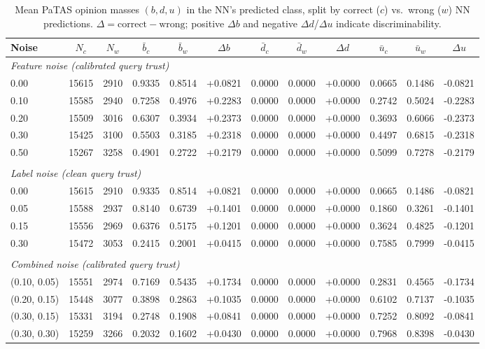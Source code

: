 \begin{table}[ht]
\centering
\caption{Mean PaTAS opinion masses $(b, d, u)$ in the NN's predicted class, split by correct ($c$) vs.\ wrong ($w$) NN predictions. $\Delta = \text{correct} - \text{wrong}$; positive $\Delta b$ and negative $\Delta d$/$\Delta u$ indicate discriminability.}
\label{tab:patas-effectiveness}
\begin{tabular}{lccccccccccc}
\toprule
Noise & $N_c$ & $N_w$ & $\bar{b}_c$ & $\bar{b}_w$ & $\Delta b$ & $\bar{d}_c$ & $\bar{d}_w$ & $\Delta d$ & $\bar{u}_c$ & $\bar{u}_w$ & $\Delta u$ \\
\midrule
\multicolumn{12}{l}{\textit{Feature noise (calibrated query trust)}} \\
0.00 & 15615 & 2910 & 0.9335 & 0.8514 & +0.0821 & 0.0000 & 0.0000 & +0.0000 & 0.0665 & 0.1486 & -0.0821 \\
0.10 & 15585 & 2940 & 0.7258 & 0.4976 & +0.2283 & 0.0000 & 0.0000 & +0.0000 & 0.2742 & 0.5024 & -0.2283 \\
0.20 & 15509 & 3016 & 0.6307 & 0.3934 & +0.2373 & 0.0000 & 0.0000 & +0.0000 & 0.3693 & 0.6066 & -0.2373 \\
0.30 & 15425 & 3100 & 0.5503 & 0.3185 & +0.2318 & 0.0000 & 0.0000 & +0.0000 & 0.4497 & 0.6815 & -0.2318 \\
0.50 & 15267 & 3258 & 0.4901 & 0.2722 & +0.2179 & 0.0000 & 0.0000 & +0.0000 & 0.5099 & 0.7278 & -0.2179 \\
\midrule \\
\multicolumn{12}{l}{\textit{Label noise (clean query trust)}} \\
0.00 & 15615 & 2910 & 0.9335 & 0.8514 & +0.0821 & 0.0000 & 0.0000 & +0.0000 & 0.0665 & 0.1486 & -0.0821 \\
0.05 & 15588 & 2937 & 0.8140 & 0.6739 & +0.1401 & 0.0000 & 0.0000 & +0.0000 & 0.1860 & 0.3261 & -0.1401 \\
0.15 & 15556 & 2969 & 0.6376 & 0.5175 & +0.1201 & 0.0000 & 0.0000 & +0.0000 & 0.3624 & 0.4825 & -0.1201 \\
0.30 & 15472 & 3053 & 0.2415 & 0.2001 & +0.0415 & 0.0000 & 0.0000 & +0.0000 & 0.7585 & 0.7999 & -0.0415 \\
\midrule \\
\multicolumn{12}{l}{\textit{Combined noise (calibrated query trust)}} \\
(0.10, 0.05) & 15551 & 2974 & 0.7169 & 0.5435 & +0.1734 & 0.0000 & 0.0000 & +0.0000 & 0.2831 & 0.4565 & -0.1734 \\
(0.20, 0.15) & 15448 & 3077 & 0.3898 & 0.2863 & +0.1035 & 0.0000 & 0.0000 & +0.0000 & 0.6102 & 0.7137 & -0.1035 \\
(0.30, 0.15) & 15331 & 3194 & 0.2748 & 0.1908 & +0.0841 & 0.0000 & 0.0000 & +0.0000 & 0.7252 & 0.8092 & -0.0841 \\
(0.30, 0.30) & 15259 & 3266 & 0.2032 & 0.1602 & +0.0430 & 0.0000 & 0.0000 & +0.0000 & 0.7968 & 0.8398 & -0.0430 \\
\bottomrule
\end{tabular}
\end{table}